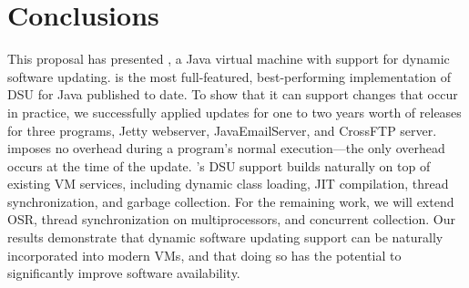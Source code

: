 \section{Conclusions}
\label{sec:conc}

This proposal has presented \DSU{}, a Java virtual machine with support for
dynamic software updating.  \DSU{} is the most full-featured,
best-performing implementation of DSU for Java published to date.  To
show that it can support changes that occur in practice, we
successfully applied updates for one to two years
worth of releases for three 
programs, Jetty webserver, JavaEmailServer, and CrossFTP server.  \DSU{}
imposes no overhead during a program's normal execution---the only
overhead occurs at the time of the update.  \DSU{}'s DSU support
builds naturally on top of existing VM services, including dynamic class
loading, \acs{JIT} compilation, thread synchronization, and garbage
collection. For the remaining work, we will extend \acs{OSR}, thread
synchronization on multiprocessors, and concurrent collection.
Our results demonstrate that dynamic software updating
support can be naturally incorporated into modern VMs, and that doing so has
the potential to significantly improve software availability.
